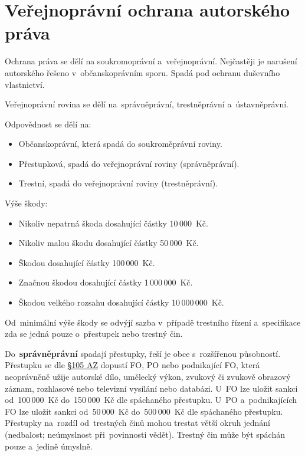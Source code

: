 \section{Veřejnoprávní ochrana autorského práva}

Ochrana práva se dělí na soukromoprávní a~veřejnoprávní. Nejčastěji je narušení autorského řešeno v~občanskoprávním sporu. Spadá pod ochranu duševního vlastnictví.

Veřejnoprávní rovina se dělí na~správněprávní, trestněprávní a~ústavněprávní.

Odpovědnost se dělí na:

\begin{itemize}
    \item Občanskoprávní, která spadá do soukroměprávní roviny.
    \item Přestupková, spadá do veřejnoprávní roviny (správněprávní).
    \item Trestní, spadá do veřejnoprávní roviny (trestněprávní).
\end{itemize}

Výše škody:

\begin{itemize}
    \item Nikoliv nepatrná škoda dosahující částky 10\,000~Kč.
    \item Nikoliv malou škodu dosahující částky 50\,000~Kč.
    \item Škodou dosahující částky 100\,000~Kč.
    \item Značnou škodou dosahující částky 1\,000\,000~Kč.
    \item Škodou velkého rozsahu dosahující částky 10\,000\,000~Kč.
\end{itemize}

Od~minimální výše škody se odvýjí sazba v~případě trestního řízení a~specifikace zda se jedná pouze o~přestupek nebo trestný čin.

Do~\textbf{správněprávní} spadají přestupky, řeší je obce s~rozšířenou působností. Přestupku se dle 
\href{https://www.zakonyprolidi.cz/cs/2000-121#p105a-1-a}{§105 AZ} dopustí FO, PO nebo podnikající FO, která neoprávněně užije autorské dílo, umělecký výkon, zvukový či zvukově obrazový záznam, rozhlasové nebo televizní vysílání nebo databázi. U~FO lze uložit sankci od~100\,000~Kč do~150\,000~Kč dle spáchaného přestupku. U~PO a~podnikajících FO lze uložit sankci od~50\,000~Kč do~500\,000~Kč dle spáchaného přestupku. Přestupky na~rozdíl od~trestných činů mohou trestat větší okruh jednání (nedbalost; neúmyslnost při~povinnosti vědět). Trestný čin může být spáchán pouze a~jedině úmyslně. 

